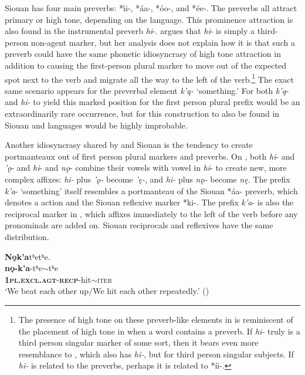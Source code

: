 \documentclass[output=paper]{LSP/langsci}
\begin{document}
Siouan has four main preverbs: *\'\i i-, *\'aa-, *\'oo-, and *\'ee-. The preverbs all attract primary  or high tone, depending on the language. This prominence attraction is also found in the  instrumental preverb \emph{hi}-. \citet{Linn2000} argues that \emph{hi}- is simply a third-person non-agent marker, but her analysis does not explain how it is that such a preverb could have the same phonetic idiosyncrasy of high tone attraction in addition to causing the first-person plural marker to move out of the expected spot next to the verb and migrate all the way to the left of the verb.\footnote{The presence of high tone on these preverb-like elements in  is reminiscent of the placement of high tone in  when a word contains a preverb. If \emph{hi-} truly is a third person singular marker of some sort, then it bears even more resemblance to , which also has \emph{hi-}, but for third person singular subjects. If \emph{hi-} is related to the  preverbs, perhaps it is related to *\'ii-.} 
The exact same scenario appears for the preverbal element \emph{k'\k{a}-} `something.' For both \emph{k'\k{a}}- and \emph{hi-} to yield this marked position for the first person plural prefix would be an extraordinarily rare occurrence, but for this construction to also be found in Siouan and  languages would be highly improbable.

Another idiosyncrasy shared by  and Siouan is the tendency to create portmanteaux out of first person plural markers and preverbs. On , both \emph{hi}- and \emph{'\k{o}}- and \emph{hi}- and \emph{n\k{o}}- combine their vowels with vowel in \emph{hi}- to create new, more complex affixes: \emph{hi-} plus \emph{'\k{o}-} become \emph{'\k{e}-}, and \emph{hi-} plus \emph{n\k{o}-} become \emph{n\k{e}}. The prefix \emph{k'a}- `something' itself resembles a portmanteau of the Siouan *\'aa- preverb, which denotes a  action and the Siouan reflexive marker *ki-. The prefix \emph{k'a}- is also the reciprocal marker in , which affixes immediately to the left of the verb before any pronominals are added on. Siouan reciprocals and reflexives have the same distribution.

\ea \label{yuchimandan}
	\ea
	\glll  \textbf{N\k{o}k'a}tʰetʰe.\\ 
	\textbf{n\k{o}-k'a}-tʰe$\sim$tʰe\\
			\textbf{\textsc{1pl.excl.agt}}-\textbf{\textsc{recp}}-hit$\sim$\textsc{iter}\\ 
	\glt `We beat each other up/We hit each other repeatedly.' (\citealt[250]{Linn2000})
	
\end{document}
